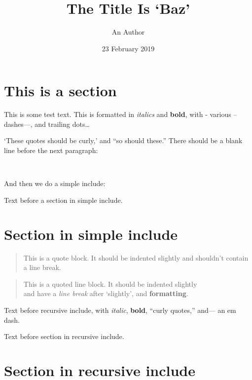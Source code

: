 \documentclass[
  12pt,
  a4paper,
]{article}
\title{The Title Is `Baz'}
\author{An Author}
\date{23 February 2019}
\begin{document}
\maketitle

\frenchspacing

{
\hypersetup{linkcolor=}
\setcounter{tocdepth}{1}
\tableofcontents
}


\hypertarget{this-is-a-section}{%
\section{This is a section}\label{this-is-a-section}}

This is some test text. This is formatted in \emph{italics} and
\textbf{bold}, with - various -- dashes---, and trailing dots\ldots{}

`These quotes should be curly,' and ``so should these.'' There should be
a blank line before the next paragraph:

~

And then we do a simple include:

Text before a section in simple include.

\hypertarget{section-in-simple-include}{%
\section{Section in simple include}\label{section-in-simple-include}}

\begin{quote}
This is a quote block. It should be indented slightly and shouldn't
contain a line break.
\end{quote}

\begin{quote}
This is a quoted line block. It should be indented slightly\\
and have a \emph{line break} after `slightly', and \textbf{formatting}.
\end{quote}

Text before recursive include, with \emph{italic}, \textbf{bold},
``curly quotes,'' and--- an em dash.

Text before section in recursive include.

\hypertarget{section-in-recursive-include}{%
\section{Section in recursive
include}\label{section-in-recursive-include}}
\end{document}

